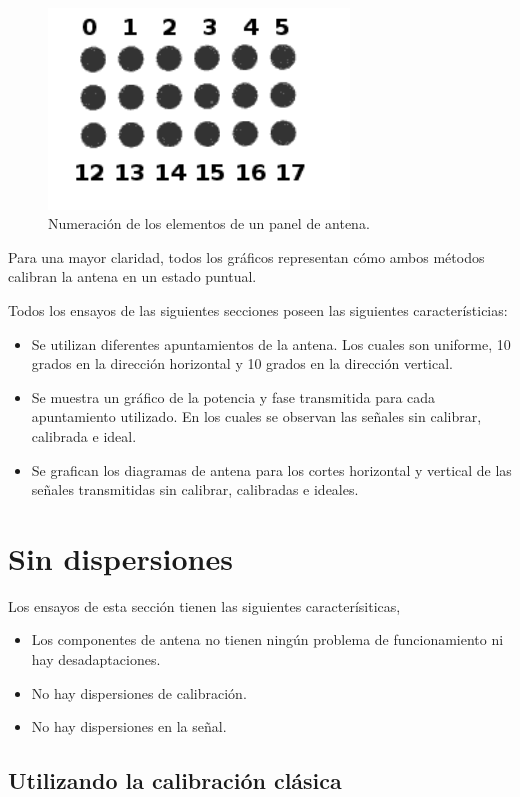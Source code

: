 \begin{figure}[H]
 \centering
 \includegraphics[width=8cm]{gfx/arrayNumeration.png}
 \caption{Numeración de los elementos de un panel de antena.}
 \label{fig:arrayNumeration}
\end{figure}

Para una mayor claridad, todos los gráficos representan cómo ambos métodos calibran la antena en un estado puntual.

Todos los ensayos de las siguientes secciones poseen las siguientes característicias:
\begin{itemize}
	\item Se utilizan diferentes apuntamientos de la antena. Los cuales son uniforme, 10 grados en la dirección horizontal y 10 
		grados en la dirección vertical.
	\item Se muestra un gráfico de la potencia y fase transmitida para cada apuntamiento utilizado. En los cuales se observan las
		señales sin calibrar, calibrada e ideal. 
	\item Se grafican los diagramas de antena para los cortes horizontal y vertical de las señales transmitidas sin calibrar, 
		calibradas e ideales.
\end{itemize}


\section{Sin dispersiones}

Los ensayos de esta sección tienen las siguientes caracterísiticas,
\begin{itemize}
	\item Los componentes de antena no tienen ningún problema de funcionamiento ni hay desadaptaciones.
	\item No hay dispersiones de calibración.
	\item No hay dispersiones en la señal.
\end{itemize}

\subsection{Utilizando la calibración clásica}

